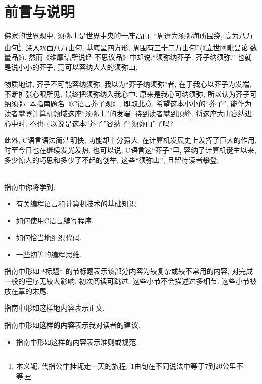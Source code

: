 \chapter*{前言与说明}
 \label{前言与说明}

    佛家的世界观中, 须弥山是世界中央的一座高山, ``周遭为须弥海所围绕, 高为八万由旬\footnote{本义轭, 代指公牛挂轭走一天的旅程. 1由旬在不同说法中等于7到20公里不等.}, 深入水面八万由旬, 基底呈四方形, 周围有三十二万由旬''(《立世阿毗昙论$\cdot$数量品》). 然而《维摩诘所说经$\cdot$不思议品》中却说:``须弥纳芥子, 芥子纳须弥.'' 也就是说小小的芥子, 竟可以容纳大大的须弥山.

    物质地讲, 芥子不可能容纳须弥. 我以为``芥子纳须弥''者, 在于我心以芥子为发端, 不断扩张心眼所见, 最终把须弥纳入我心中. 原来是我心可纳须弥, 所以认为芥子可纳须弥. 本指南题名《C语言芥子观》, 即取此意, 希望这本小小的``芥子'', 能作为读者攀登计算机领域这座``须弥山''的发端. 待到读者攀到顶峰, 将这座大山容纳进心中时, 不也可以说是这本``芥子''容纳了``须弥山''了吗?

    此外, C语言语法简洁明快, 功能却十分强大, 在计算机发展史上发挥了巨大的作用, 时至今日也在继续发光发热. 也可以说, C语言这``芥子''里, 容纳了计算机诞生以来, 多少惊人的巧思和多少了不起的创举. 这些``须弥山'', 且留待读者攀登.

    \leavevmode \\
    指南中你将学到:
    \begin{itemize}
        \item 有关编程语言和计算机技术的基础知识.
        \item 如何使用C语言编写程序.
        \item 如何恰当地组织代码.
        \item 一些初等的编程思维.
    \end{itemize}

    \vspace*{5pt}

    指南中形如 \texttt{*}标题\texttt{*} 的节标题表示该部分内容为较复杂或较不常用的内容, 对完成一般的程序无较大影响, 初次阅读可跳过. 这些小节不会描述过多细节. 这些小节被放在章的末尾.

    \vspace*{5pt}
    指南中形如这样地内容表示正文. 

    \vspace*{5pt}
    指南中形如\textbf{这样的内容}表示我对读者的建议.

    \begin{itemize}
        \item 指南中形如这样的内容表示准则或规范.
    \end{itemize}

